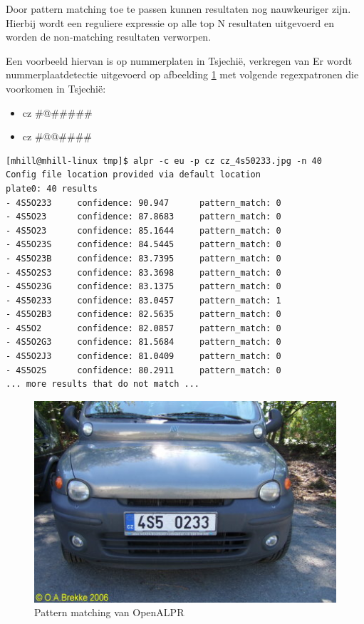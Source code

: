 Door pattern matching toe te passen kunnen resultaten nog nauwkeuriger zijn. Hierbij wordt een reguliere expressie op alle top N resultaten uitgevoerd en worden de non-matching resultaten verworpen.

Een voorbeeld hiervan is op nummerplaten in Tsjechië, verkregen van \textcite{openalpr2015pattern}
Er wordt nummerplaatdetectie uitgevoerd op afbeelding \ref{patternmatching} met volgende regexpatronen die voorkomen in Tsjechië:
\begin{itemize}
	\item cz \#@\#\#\#\#\#
	\item cz \#@@\#\#\#\#
\end{itemize}

\begin{lstlisting}
[mhill@mhill-linux tmp]$ alpr -c eu -p cz cz_4s50233.jpg -n 40
Config file location provided via default location
plate0: 40 results
- 4S5O233     confidence: 90.947      pattern_match: 0
- 4S5O23      confidence: 87.8683     pattern_match: 0
- 4S5O23      confidence: 85.1644     pattern_match: 0
- 4S5O23S     confidence: 84.5445     pattern_match: 0
- 4S5O23B     confidence: 83.7395     pattern_match: 0
- 4S5O2S3     confidence: 83.3698     pattern_match: 0
- 4S5O23G     confidence: 83.1375     pattern_match: 0
- 4S50233     confidence: 83.0457     pattern_match: 1
- 4S5O2B3     confidence: 82.5635     pattern_match: 0
- 4S5O2       confidence: 82.0857     pattern_match: 0
- 4S5O2G3     confidence: 81.5684     pattern_match: 0
- 4S5O2J3     confidence: 81.0409     pattern_match: 0
- 4S5O2S      confidence: 80.2911     pattern_match: 0
... more results that do not match ...
\end{lstlisting}

\begin{figure}[h!]
	\centering
	\includegraphics[width=\linewidth]{img/pattern-matching.jpg}
	\caption{Pattern matching van OpenALPR \autocite{openalpr2015pattern}}
	\label{patternmatching}
\end{figure}

